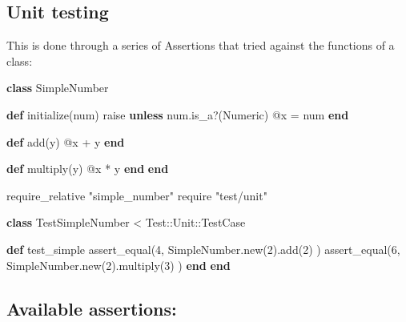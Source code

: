 \documentclass[]{book}
\newenvironment{Shaded}{\begin{snugshade}}{\end{snugshade}}
\newcommand{\DataTypeTok}[1]{\textcolor[rgb]{0.13,0.29,0.53}{#1}}
\newcommand{\DecValTok}[1]{\textcolor[rgb]{0.00,0.00,0.81}{#1}}
\newcommand{\KeywordTok}[1]{\textcolor[rgb]{0.13,0.29,0.53}{\textbf{#1}}}
\newcommand{\NormalTok}[1]{#1}
\newcommand{\OtherTok}[1]{\textcolor[rgb]{0.56,0.35,0.01}{#1}}
\newcommand{\StringTok}[1]{\textcolor[rgb]{0.31,0.60,0.02}{#1}}
\begin{document}
\hypertarget{unit-testing}{%
\subsection{Unit testing}\label{unit-testing}}

This is done through a series of Assertions that tried against the functions of a class:

\begin{Shaded}
\begin{Highlighting}[]
\KeywordTok{class} \DataTypeTok{SimpleNumber}

   \KeywordTok{def}\NormalTok{ initialize(num)}
\NormalTok{       raise }\KeywordTok{unless}\NormalTok{ num.is_a?(}\DataTypeTok{Numeric}\NormalTok{)}
       \OtherTok{@x}\NormalTok{ = num}
   \KeywordTok{end}

   \KeywordTok{def}\NormalTok{ add(y)}
      \OtherTok{@x}\NormalTok{ + y}
   \KeywordTok{end}

   \KeywordTok{def}\NormalTok{ multiply(y)}
       \OtherTok{@x}\NormalTok{ * y}
   \KeywordTok{end}
\KeywordTok{end}
\end{Highlighting}
\end{Shaded}

\begin{Shaded}
\begin{Highlighting}[]
\NormalTok{require_relative }\StringTok{"simple_number"}
\NormalTok{require }\StringTok{"test/unit"}
     
\KeywordTok{class} \DataTypeTok{TestSimpleNumber}\NormalTok{ < }\DataTypeTok{Test}\NormalTok{::}\DataTypeTok{Unit}\NormalTok{::}\DataTypeTok{TestCase}
     
  \KeywordTok{def}\NormalTok{ test_simple}
\NormalTok{    assert_equal(}\DecValTok{4}\NormalTok{, }\DataTypeTok{SimpleNumber}\NormalTok{.new(}\DecValTok{2}\NormalTok{).add(}\DecValTok{2}\NormalTok{) )}
\NormalTok{    assert_equal(}\DecValTok{6}\NormalTok{, }\DataTypeTok{SimpleNumber}\NormalTok{.new(}\DecValTok{2}\NormalTok{).multiply(}\DecValTok{3}\NormalTok{) )}
  \KeywordTok{end}    
\KeywordTok{end}
\end{Highlighting}
\end{Shaded}

\hypertarget{available-assertions}{%
\subsection{Available assertions:}\label{available-assertions}}
\end{document}
